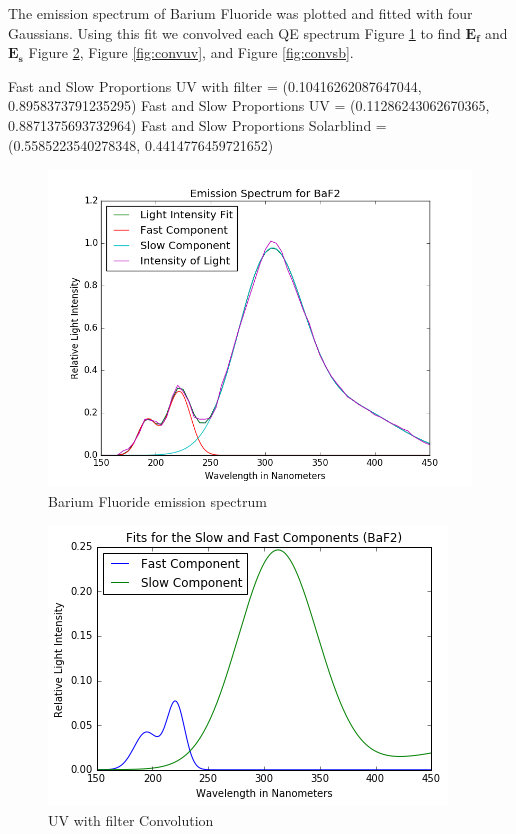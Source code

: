 \documentclass[aip, jmp, amssymb, amsmath, reprint, floatfix]{revtex4-1}
\begin{document}
The emission spectrum of Barium Fluoride was plotted and fitted with four Gaussians. Using this fit we convolved each QE spectrum Figure \ref{fig:FitsBaF2} to find $\bm{E_f}$ and $\bm{E_s}$ Figure \ref{fig:convf}, Figure \ref{fig:convuv}, and Figure \ref{fig:convsb}.

\setlength{\parskip}{2em}
\noindent
Fast and Slow Proportions UV with filter = (0.10416262087647044, 0.8958373791235295)
\noindent
Fast and Slow Proportions UV = (0.11286243062670365, 0.8871375693732964)
\noindent
Fast and Slow Proportions Solarblind = (0.5585223540278348, 0.4414776459721652)

\begin{figure}
  \centering
    \includegraphics[width=.8\columnwidth]{FitsBaF2.png}
  \caption{Barium Fluoride emission spectrum}
  \label{fig:FitsBaF2}
\end{figure} 

\begin{figure}
  \centering
    \includegraphics[width=.8\columnwidth]{convf.png}
  \caption{UV with filter Convolution}
  \label{fig:convf}
\end{figure} 
\end{document}
